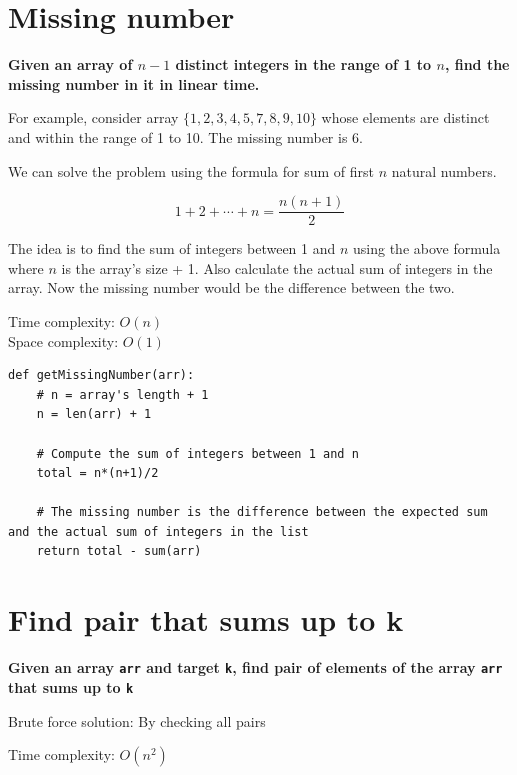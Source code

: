 \documentclass[a4paper,11pt]{book}
\begin{document}
\newpage
\section{Missing number}

\textbf{Given an array of $n-1$ distinct integers in the range of 1 to $n$, find the missing number in it in linear time.}
\vspace{5mm}

\noindent For example, consider array $\{1, 2, 3, 4, 5, 7, 8, 9, 10\}$ whose elements are distinct and within the range of 1 to 10. The missing number is 6.

\vspace{5mm}

\noindent We can solve the problem using the formula for sum of first $n$ natural numbers.

$$1 + 2 + \cdots + n = \dfrac{n(n+1)}{2}$$

\noindent The idea is to find the sum of integers between 1 and $n$ using the above formula where $n$ is the array's size + 1. Also calculate the actual sum of integers in the array. Now the missing number would be the difference between the two.

\noindent Time complexity:  $O(n)$\\
\noindent Space complexity: $O(1)$

\begin{lstlisting}
def getMissingNumber(arr):
    # n = array's length + 1
    n = len(arr) + 1
 
    # Compute the sum of integers between 1 and n
    total = n*(n+1)/2
 
    # The missing number is the difference between the expected sum and the actual sum of integers in the list
    return total - sum(arr)
\end{lstlisting}




\newpage
\section{Find pair that sums up to k}

\textbf{Given an array \lstinline{arr} and target \lstinline{k}, find pair of elements of the array \lstinline{arr} that sums up to \lstinline{k}}
\vspace{5mm}

\noindent Brute force solution: By checking all pairs

\noindent Time complexity:  $O(n^2)$
\end{document}
